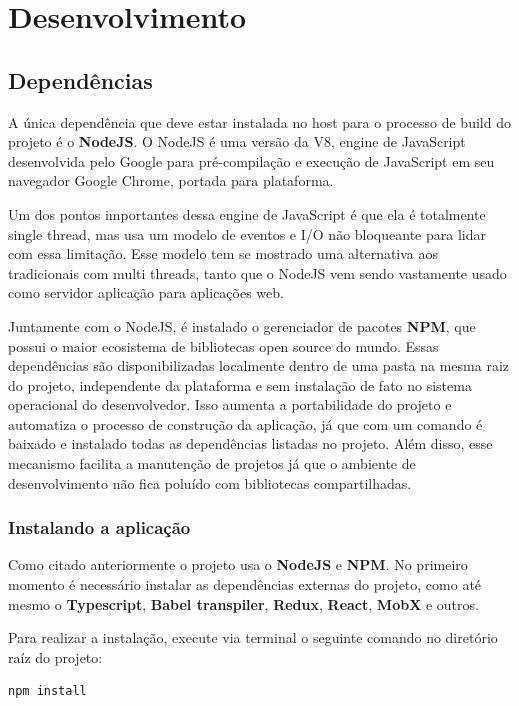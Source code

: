 \documentclass[rel_mlp]{iiufrgs}
\begin{document}
\chapter{Desenvolvimento}


\section{Dependências}
A única dependência que deve estar instalada no host para o processo de build do projeto é o \textbf{NodeJS}.
O NodeJS é uma versão da V8, engine de JavaScript desenvolvida pelo Google para pré-compilação e execução de
JavaScript em seu navegador Google Chrome, portada para plataforma. \par
Um dos pontos importantes dessa engine de JavaScript é que ela é totalmente single thread, mas usa um modelo de eventos e I/O não bloqueante para lidar com essa limitação. Esse modelo tem se mostrado uma alternativa aos tradicionais com multi threads, tanto que o NodeJS vem sendo vastamente usado como servidor aplicação para aplicações web. \par
Juntamente com o NodeJS, é instalado o gerenciador de pacotes \textbf{NPM}, que possui o maior ecosistema de bibliotecas open source do mundo.
Essas dependências são disponibilizadas localmente dentro de uma pasta na mesma raiz do projeto, independente da plataforma e sem instalação de fato no sistema operacional do desenvolvedor. 
Isso aumenta a portabilidade do projeto e automatiza o processo de construção da aplicação, já que com um comando é baixado e instalado todas as dependências listadas no projeto. 
Além disso, esse mecanismo facilita a manutenção de projetos já que o ambiente de desenvolvimento não fica poluído com bibliotecas compartilhadas.

\subsection{Instalando a aplicação}
Como citado anteriormente o projeto usa o \textbf{NodeJS} e \textbf{NPM}. No primeiro momento é necessário instalar as dependências externas do projeto, como até mesmo o \textbf{Typescript}, \textbf{Babel transpiler}, \textbf{Redux}, \textbf{React}, \textbf{MobX} e outros. \par
Para realizar a instalação, execute via terminal o seguinte comando no diretório raíz do projeto:

\begin{lstlisting}[language=JavaScript]
  npm install
\end{lstlisting}
\end{document}
